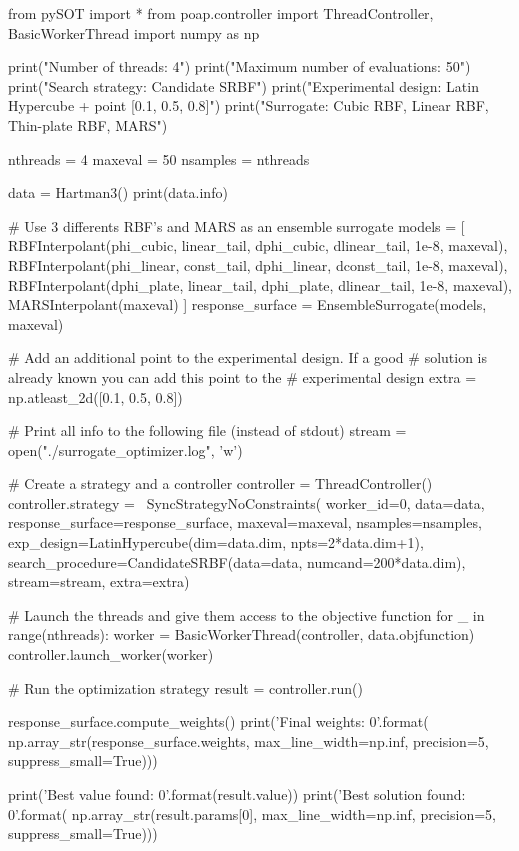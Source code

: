 \documentclass[]{article}
\begin{document}
\begin{python}
from pySOT import *
from poap.controller import ThreadController, BasicWorkerThread
import numpy as np

print("Number of threads: 4")
print("Maximum number of evaluations: 50")
print("Search strategy: Candidate SRBF")
print("Experimental design: Latin Hypercube + point [0.1, 0.5, 0.8]")
print("Surrogate: Cubic RBF, Linear RBF, Thin-plate RBF, MARS")

nthreads = 4
maxeval = 50
nsamples = nthreads

data = Hartman3()
print(data.info)

# Use 3 differents RBF's and MARS as an ensemble surrogate
models = [
    RBFInterpolant(phi_cubic, linear_tail, dphi_cubic,
                   dlinear_tail, 1e-8, maxeval),
    RBFInterpolant(phi_linear, const_tail, dphi_linear,
                   dconst_tail, 1e-8, maxeval),
    RBFInterpolant(dphi_plate, linear_tail, dphi_plate,
                   dlinear_tail, 1e-8, maxeval),
    MARSInterpolant(maxeval)
]
response_surface = EnsembleSurrogate(models, maxeval)

# Add an additional point to the experimental design. If a good
# solution is already known you can add this point to the
# experimental design
extra = np.atleast_2d([0.1, 0.5, 0.8])

# Print all info to the following file (instead of stdout)
stream = open("./surrogate_optimizer.log", 'w')

# Create a strategy and a controller
controller = ThreadController()
controller.strategy = \
    SyncStrategyNoConstraints(
        worker_id=0, data=data,
        response_surface=response_surface,
        maxeval=maxeval, nsamples=nsamples,
        exp_design=LatinHypercube(dim=data.dim, npts=2*data.dim+1),
        search_procedure=CandidateSRBF(data=data, numcand=200*data.dim),
        stream=stream, extra=extra)

# Launch the threads and give them access to the objective function
for _ in range(nthreads):
    worker = BasicWorkerThread(controller, data.objfunction)
    controller.launch_worker(worker)

# Run the optimization strategy
result = controller.run()

response_surface.compute_weights()
print('Final weights: {0}'.format(
    np.array_str(response_surface.weights, max_line_width=np.inf,
                 precision=5, suppress_small=True)))

print('Best value found: {0}'.format(result.value))
print('Best solution found: {0}'.format(
    np.array_str(result.params[0], max_line_width=np.inf,
                 precision=5, suppress_small=True)))
\end{python}
\end{document}
